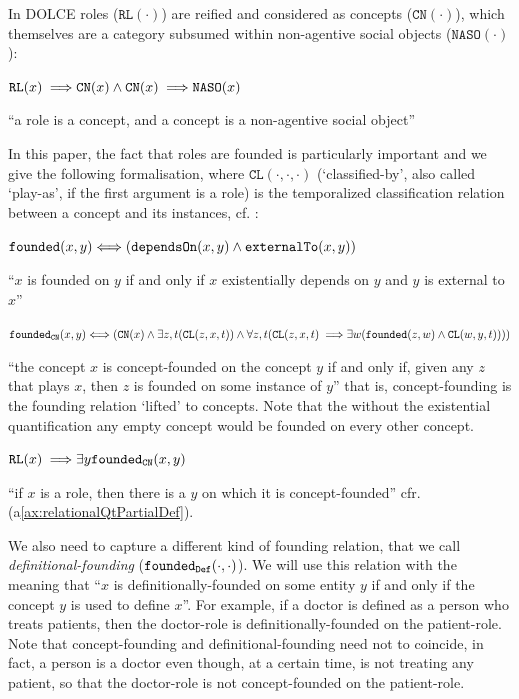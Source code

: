 \documentclass[sw]{iosart2x}
\newcommand{\bflist}{\begin{list}{}{\setlength{\topsep}{2mm}\setlength{\partopsep}{0mm}\setlength{\parsep}{0mm}\setlength{\leftmargin}{9mm}\setlength{\labelwidth}{8mm}}}
\newcommand{\eflist}{\end{list}}
\newcommand{\AxLabel}{\textrm{a}}
\newcommand{\DefLabel}{\textrm{d}}
\newcounter{cntax}
\newcommand{\myax}[1]{\refstepcounter{cntax}\begin{small}{\bf \AxLabel\thecntax\label{ax:#1}}\end{small}}
\newcounter{cntdef}
\newcommand{\mydf}[1]{\refstepcounter{cntdef}\begin{small}{\bf \DefLabel\thecntdef\label{def:#1}}\end{small}}
\newcommand{\mytext}[1]{``#1''}
\newcommand{\refax}[1]{({\AxLabel}\ref{#1})}
\newcommand{\generalStyle}[1]{\texttt{#1}}
\newcommand{\biRel}[3]{\generalStyle{#1}(#2,#3)}
\newcommand{\uniRel}[2]{\generalStyle{#1}(#2)}
\newcommand{\biRelPar}[4]{\generalStyle{#1}_{\generalStyle{#4}}(#2,#3)}
\newcommand{\triRel}[4]{\generalStyle{#1}(#2,#3,#4)}
\newcommand{\myiff}{\Longleftrightarrow}
\newcommand{\myfi}{\hspace{0.9mm} \Longrightarrow}
\newcommand{\DOLCE}{\textsc{DOLCE}\xspace} %
\newcommand{\DOLCERole}[1]{\uniRel{{RL}}{#1}}
\newcommand{\DOLCENASO}[1]{\uniRel{{NASO}}{#1}}
\newcommand{\DOLCEConcept}[1]{\uniRel{{CN}}{#1}}
\newcommand{\DOLCECLby}[3]{\triRel{CL}{#1}{#2}{#3}}
\newcommand{\specificallyDependsOn}[2]{\biRel{dependsOn}{#1}{#2}}
\newcommand{\founded}[2]{\biRel{\foundedTerm{passive}}{#1}{#2}}
\newcommand{\external}[2]{\biRel{externalTo}{#1}{#2}}
\newcommand{\playAs}[3]{\triRel{playAs}{#1}{#2}{#3}}
\newcommand{\foundedROLE}[2]{\biRelPar{\foundedTerm{passive}}{#1}{#2}{CN}}
\newcommand{\foundedDef}[2]{\biRelPar{\foundedTerm{passive}}{#1}{#2}{Def}}
\newcommand{\firstTimeKeyWord}[1]{\textit{#1}}
\newcommand{\foundedTerm}[1]{%
  \ifthenelse{\equal{#1}{passive}}{founded}{%
    \ifthenelse{\equal{#1}{verb}}{found}{%
      \ifthenelse{\equal{#1}{gerund}}{founding}{%
        ERROR!%
      }%
    }%
  }%
}
\newcommand{\myComment}[1]{}
\begin{document}
In \DOLCE roles ($\DOLCERole{\cdot}$) are reified and considered as concepts ($\DOLCEConcept{\cdot}$), which themselves are a category subsumed within non-agentive social objects ($\DOLCENASO{\cdot}$):
\bflist
  \item[\myax{roleSussum}] $ \DOLCERole{x} \myfi \DOLCEConcept{x} \land \DOLCEConcept{x} \myfi \DOLCENASO{x}$
  \item[] \mytext{a role is a concept, and a concept is a non-agentive social object}
\eflist
In this paper, the fact that roles are founded is particularly important and we give the following formalisation, where $\DOLCECLby{\cdot}{\cdot}{\cdot}$ (`classified-by', also called `play-as', if the first argument is a role) is the temporalized classification relation between a concept and its instances, cf. \cite{masoloSocialRolesTheir2004}: %
\bflist
\item[\mydf{foundingBasic}] $ \founded{x}{y} \myiff (\specificallyDependsOn{x}{y} \land \external{x}{y})$
\item[] \mytext{$x$ is founded on $y$ if and only if $x$ existentially depends on $y$ and $y$ is external to $x$}
\item[\mydf{founding}] $ \foundedROLE{x}{y} \myiff (\DOLCEConcept{x} \land \exists z,t (\DOLCECLby{z}{x}{t}) \land \forall z,t (\DOLCECLby{z}{x}{t} \myfi \exists w (\founded{z}{w} \land \DOLCECLby{w}{y}{t})))$
\item[] \mytext{the concept $x$ is concept-founded on the concept $y$ if and only if, given any $z$ that plays $x$, then $z$ is founded on some instance of $y$} that is, concept-founding is the founding relation `lifted' to concepts. Note that the without the existential quantification any empty concept would be founded on every other concept.

\item[\myax{roleFounding}] $ \DOLCERole{x} \myfi \exists y \foundedROLE{x}{y} $ 
\item[] \mytext{if $x$ is a role, then there is a $y$ on which it is concept-founded} cfr. \refax{ax:relationalQtPartialDef}.
\eflist 

We also need to capture a different kind of founding relation, that we call \firstTimeKeyWord{definitional-founding} ($\foundedDef{\cdot}{\cdot}$). We will use this relation with the meaning that \mytext{$x$ is definitionally-founded on some \myComment{concept}entity $y$ if and only if the concept $y$ is used to define $x$}. For example, if a doctor is defined as a person who treats patients, then the doctor-role is definitionally-founded on the patient-role.  %
Note that concept-founding and definitional-founding need not to coincide, in fact, a person is a doctor even though, at a certain time, is not treating any patient, so that the doctor-role is not concept-founded on the patient-role.
\end{document}
